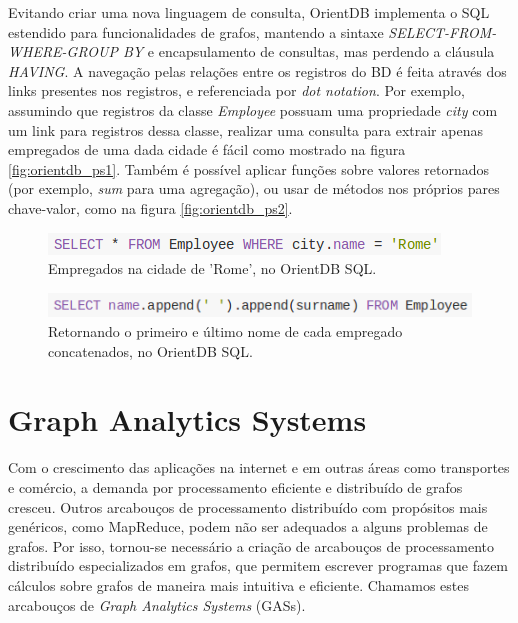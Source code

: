 \documentclass[conference]{IEEEtran}
\begin{document}
Evitando criar uma nova linguagem de consulta, OrientDB implementa o SQL estendido para funcionalidades de grafos, mantendo a sintaxe \emph{SELECT-FROM-WHERE-GROUP BY} e encapsulamento de consultas, mas perdendo a cláusula \emph{HAVING}. A navegação pelas relações entre os registros do BD é feita através dos links presentes nos registros, e referenciada por \emph{dot notation}. Por exemplo, assumindo que registros da classe \emph{Employee} possuam uma propriedade \emph{city} com um link para registros dessa classe, realizar uma consulta para extrair apenas empregados de uma dada cidade é fácil como mostrado na figura \ref{fig:orientdb_ps1}. Também é possível aplicar funções sobre valores retornados (por exemplo, \emph{sum} para uma agregação), ou usar de métodos nos próprios pares chave-valor, como na figura \ref{fig:orientdb_ps2}.

\begin{figure}[htbp]
\centerline{\includegraphics[width=0.9\linewidth]{orientdb_ps1.png}}
\caption{Empregados na cidade de 'Rome', no OrientDB SQL.}\label{fig:orientdb_ps1}
\label{fig}
\end{figure}

\begin{figure}[htbp]
\centerline{\includegraphics[width=0.9\linewidth]{orientdb_ps2.png}}
\caption{Retornando o primeiro e último nome de cada empregado concatenados, no OrientDB SQL.}\label{fig:orientdb_ps2}
\label{fig}
\end{figure}

\cite{nole-sartiani}
\cite{horton}
\cite{thingspan}

\section{Graph Analytics Systems}
Com o crescimento das aplicações na internet e em outras áreas como
transportes e comércio, a demanda por processamento eficiente e
distribuído de grafos cresceu. Outros arcabouços de processamento
distribuído com propósitos mais genéricos, como MapReduce, podem não ser
adequados a alguns problemas de grafos. Por isso, tornou-se necessário a
criação de arcabouços de processamento distribuído especializados em
grafos, que permitem escrever programas que fazem cálculos sobre grafos
de maneira mais intuitiva e eficiente. Chamamos estes arcabouços de
{\em Graph Analytics Systems} (GASs).
\end{document}
